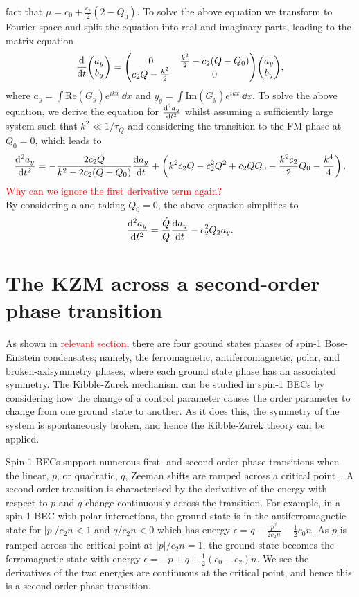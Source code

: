 fact that $\mu = c_0 + \frac{c_2}{2}(2-Q_0)$.
To solve the above equation we transform to Fourier space and split the equation
into real and imaginary parts, leading to the matrix equation
\begin{equation}
    \dv{t} \mqty(a_y \\ b_y) = \mqty(0 & \frac{k^2}{2}-c_2(Q-Q_0) \\
                                     c_2Q - \frac{k^2}{2} & 0)
                                \mqty(a_y \\ b_y),
\end{equation}
where $a_y = \int \mathrm{Re}(G_y)e^{ikx} \, \dd x$ and
$y_y = \int \mathrm{Im}(G_y)e^{ikx} \, \dd x$.
To solve the above equation, we derive the equation for $\dv[2]{a_y}{t}$ whilst 
assuming a sufficiently large system such that $k^2 \ll 1/\tau_Q$ and
considering the transition to the FM phase at $Q_0=0$, which leads to
\begin{equation}
    \dv[2]{a_y}{t} = -\frac{2c_2\dot{Q}}{k^2 - 2c_2(Q-Q_0)}\dv{a_y}{t} 
    + \left(k^2c_2Q - c_2^2Q^2 + c_2QQ_0 - \frac{k^2c_2}{2}Q_0 
    - \frac{k^4}{4}\right).
\end{equation}
\textcolor{red}{Why can we ignore the first derivative term again?}\\
By considering a 
and taking $Q_0 = 0$, the above equation simplifies to
\begin{equation}
    \dv[2]{a_y}{t} = \frac{\dot{Q}}{Q}\dv{a_y}{t} - c_2^2Q_2a_y.
\end{equation}



\section{The KZM across a second-order phase transition}
As shown in \textcolor{red}{relevant section}, there are four ground states
phases of spin-1 Bose-Einstein condensates; namely, the ferromagnetic,
antiferromagnetic, polar, and broken-axisymmetry phases, where each ground
state phase has an associated symmetry.
The Kibble-Zurek mechanism can be studied in spin-1 BECs by considering how
the change of a control parameter causes the order parameter to change from 
one ground state to another.
As it does this, the symmetry of the system is spontaneously broken, and hence
the Kibble-Zurek theory can be applied.

Spin-1 BECs support numerous first- and second-order phase transitions
when the linear, $p$, or quadratic, $q$, Zeeman shifts are
ramped across a critical point~\cite{Kawaguchi2012}.
A second-order transition is characterised by the derivative of the energy with
respect to $p$ and $q$ change continuously across the transition.
For example, in a spin-1 BEC with polar interactions, the ground state is in
the antiferromagnetic state for $|p|/c_2n<1$ and $q/c_2n<0$ which has energy
$\epsilon = q - \frac{p^2}{2c_2n}-\frac{1}{2}c_0n$.
As $p$ is ramped across the critical point at $|p|/c_2n=1$, the ground state
becomes the ferromagnetic state with energy
$\epsilon = -p + q + \frac{1}{2}(c_0 - c_2)n$.
We see the derivatives of the two energies are continuous at the critical point,
and hence this is a second-order phase transition.

